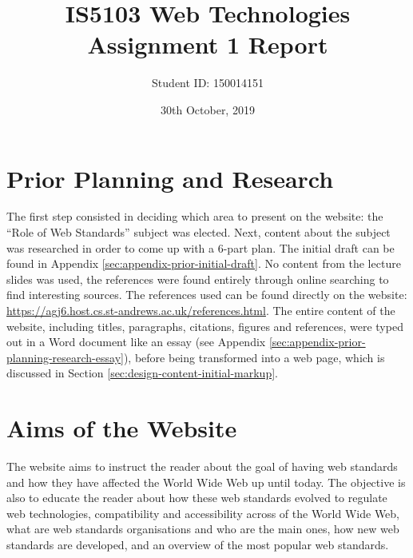 \documentclass[letterpaper,12pt]{article}
\begin{document}
\title{IS5103 Web Technologies\\Assignment 1 Report}
\author{Student ID: 150014151}
\date{30th October, 2019}
\maketitle
\newpage

\tableofcontents
\newpage


\section{Prior Planning and Research}
\label{sec:prior-planning-research}

The first step consisted in deciding which area to present on the website: the ``Role of Web Standards'' subject was elected. Next, content about the subject was researched in order to come up with a 6-part plan. The initial draft can be found in Appendix \ref{sec:appendix-prior-initial-draft}. No content from the lecture slides was used, the references were found entirely through online searching to find interesting sources. The references used can be found directly on the website: \url{https://agj6.host.cs.st-andrews.ac.uk/references.html}. The entire content of the website, including titles, paragraphs, citations, figures and references, were typed out in a Word document like an essay (see Appendix \ref{sec:appendix-prior-planning-research-essay}), before being transformed into a web page, which is discussed in Section \ref{sec:design-content-initial-markup}.


\section{Aims of the Website}
\label{sec:aims}

The website aims to instruct the reader about the goal of having web standards and how they have affected the World Wide Web up until today. The objective is also to educate the reader about how these web standards evolved to regulate web technologies, compatibility and accessibility across of the World Wide Web, what are web standards organisations and who are the main ones, how new web standards are developed, and an overview of the most popular web standards.
\end{document}
